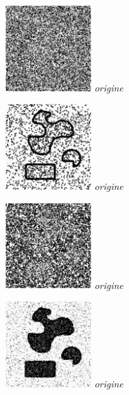 \documentclass[a4,12pt]{article}
\begin{document}
\begin{minipage}[c]{0.20\linewidth}
	\begin{center}
		\includegraphics[width = 33mm]{./img/p2test_grad_mean_formes1pets10.jpg}
		\textit{origine}
	\end{center}
\end{minipage}
\begin{minipage}[c]{0.20\linewidth}
	\begin{center}
		\includegraphics[width = 33mm]{./img/p2test_grad_mean_formes1pets1.jpg}
		\textit{origine}
	\end{center}
\end{minipage}
\begin{minipage}[c]{0.20\linewidth}
	\begin{center}
		\includegraphics[width = 33mm]{./img/p2test_grad_mean_formes1pets5.jpg}
		\textit{origine}
	\end{center}
\end{minipage}
\begin{minipage}[c]{0.20\linewidth}
	\begin{center}
		\includegraphics[width = 33mm]{./img/p2test_grad_mean_formes1sp.jpg}
		\textit{origine}
	\end{center}
\end{minipage}
\end{document}
